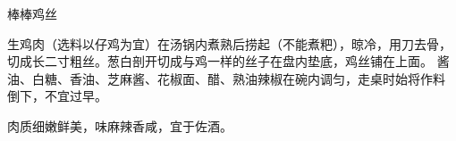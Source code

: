 \begin{recipe}{棒棒鸡丝}

\ingredients


\cooking

\step 生鸡肉（选料以仔鸡为宜）在汤锅内煮熟后捞起（不能煮粑），晾冷，用刀去骨，
切成长二寸粗丝。葱白剖开切成与鸡一样的丝子在盘内垫底，鸡丝铺在上面。
\step 酱油、白糖、香油、芝麻酱、花椒面、醋、熟油辣椒在碗内调匀，走桌时始将作料
倒下，不宜过早。

\features

肉质细嫩鲜美，味麻辣香咸，宜于佐酒。

\end{recipe}

